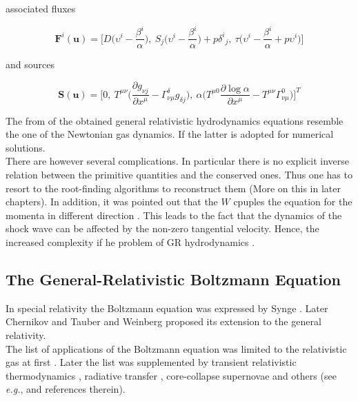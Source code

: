 \documentclass[11pt,a4paper,headinclude=true,DIV=14,BCOR=8mm,chapterprefix,listof=totoc,twoside,openright,abstracton]{scrbook}
\begin{document}
associated fluxes

\begin{equation}
    \boldsymbol{F}^i(\boldsymbol{u})=\Bigg[D\Big(\upsilon^{i}-\frac{\beta^i}{\alpha}\Big),\: S_{j}\Big(\upsilon^{i}-\frac{\beta^i}{\alpha}\Big)+p{\delta^i}_j ,\: \tau\Big(\upsilon^{i}-\frac{\beta^i}{\alpha}+p\upsilon^i\Big)\Bigg]
\end{equation}

and sources 

\begin{equation}
    \boldsymbol{S}(\boldsymbol{u}) = \Bigg[0,\: T^{\mu\nu}\Big(\frac{\partial g_{\nu j}}{\partial x^{\mu}} - \Gamma^{\delta}_{\nu\mu}g_{\delta j}\Big),\: \alpha\Big(T^{\mu 0}\frac{\partial\log\alpha}{\partial x^{\mu}}-T^{\mu\nu}\Gamma^{0}_{\nu\mu}\Big)\Bigg]^T
\end{equation}

The from of the obtained general relativistic hydrodynamics equations resemble the one of the Newtonian gas dynamics. If the latter is adopted for numerical solutions. \\
There are however several complications. In particular there is no explicit inverse relation between the primitive quantities and the conserved ones. Thus one has to resort to the root-finding algorithms to reconstruct them (More on this in later chapters). In addition, it was pointed out that the $W$ cpuples the equation for the momenta in different direction \cite{Pons:2000,Rezzolla:2002ra,Rezzolla:2002cc,Aloy:2006rd}. This leads to the fact that the dynamics of the shock wave can be affected by the non-zero tangential velocity. Hence, the increased complexity if he problem of GR hydrodynamics \cite{Mignone:2005ns,Zhang:2005qy}.


\subsection{The General-Relativistic Boltzmann Equation}

In special relativity the Boltzmann equation was expressed by Synge \cite{Synge:1957}. Later Chernikov \cite{Chernikov:1962} and Tauber and Weinberg \cite{Tauber:1961} proposed its extension to the general relativity. \\
The list of applications of the Boltzmann equation was limited to the relativistic gas at first \cite{Israel:1963}. Later the list was supplemented by transient relativistic thermodynamics \cite{Israel:1979wp}, radiative transfer \cite{Lindquist:1966}, core-collapse supernovae \cite{Bruenn:1985} and others (see \textit{e.g.}, \cite{Cercignani:2002} and references therein). \\
\end{document}
